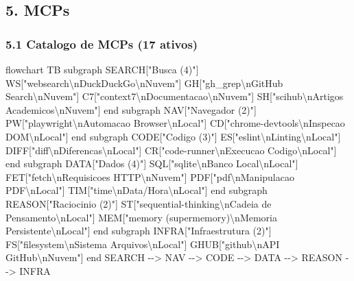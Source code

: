 \documentclass[
  12pt,
]{article}
\newenvironment{Shaded}{}{}
\newcommand{\NormalTok}[1]{#1}
\begin{document}
\subsection{5. MCPs}\label{mcps}

\subsubsection{5.1 Catalogo de MCPs (17
ativos)}\label{catalogo-de-mcps-17-ativos}

\begin{Shaded}
\begin{Highlighting}[]
\NormalTok{flowchart TB}
\NormalTok{subgraph SEARCH["Busca (4)"]}
\NormalTok{WS["websearch\textbackslash{}nDuckDuckGo\textbackslash{}nNuvem"]}
\NormalTok{GH["gh\_grep\textbackslash{}nGitHub Search\textbackslash{}nNuvem"]}
\NormalTok{C7["context7\textbackslash{}nDocumentacao\textbackslash{}nNuvem"]}
\NormalTok{SH["scihub\textbackslash{}nArtigos Academicos\textbackslash{}nNuvem"]}
\NormalTok{end}
\NormalTok{subgraph NAV["Navegador (2)"]}
\NormalTok{PW["playwright\textbackslash{}nAutomacao Browser\textbackslash{}nLocal"]}
\NormalTok{CD["chrome{-}devtools\textbackslash{}nInspecao DOM\textbackslash{}nLocal"]}
\NormalTok{end}
\NormalTok{subgraph CODE["Codigo (3)"]}
\NormalTok{ES["eslint\textbackslash{}nLinting\textbackslash{}nLocal"]}
\NormalTok{DIFF["diff\textbackslash{}nDiferencas\textbackslash{}nLocal"]}
\NormalTok{CR["code{-}runner\textbackslash{}nExecucao Codigo\textbackslash{}nLocal"]}
\NormalTok{end}
\NormalTok{subgraph DATA["Dados (4)"]}
\NormalTok{SQL["sqlite\textbackslash{}nBanco Local\textbackslash{}nLocal"]}
\NormalTok{FET["fetch\textbackslash{}nRequisicoes HTTP\textbackslash{}nNuvem"]}
\NormalTok{PDF["pdf\textbackslash{}nManipulacao PDF\textbackslash{}nLocal"]}
\NormalTok{TIM["time\textbackslash{}nData/Hora\textbackslash{}nLocal"]}
\NormalTok{end}
\NormalTok{subgraph REASON["Raciocinio (2)"]}
\NormalTok{ST["sequential{-}thinking\textbackslash{}nCadeia de Pensamento\textbackslash{}nLocal"]}
\NormalTok{MEM["memory (supermemory)\textbackslash{}nMemoria Persistente\textbackslash{}nLocal"]}
\NormalTok{end}
\NormalTok{subgraph INFRA["Infraestrutura (2)"]}
\NormalTok{FS["filesystem\textbackslash{}nSistema Arquivos\textbackslash{}nLocal"]}
\NormalTok{GHUB["github\textbackslash{}nAPI GitHub\textbackslash{}nNuvem"]}
\NormalTok{end}
\NormalTok{SEARCH {-}{-}\textgreater{} NAV {-}{-}\textgreater{} CODE {-}{-}\textgreater{} DATA {-}{-}\textgreater{} REASON {-}{-}\textgreater{} INFRA}
\end{Highlighting}
\end{Shaded}
\end{document}
